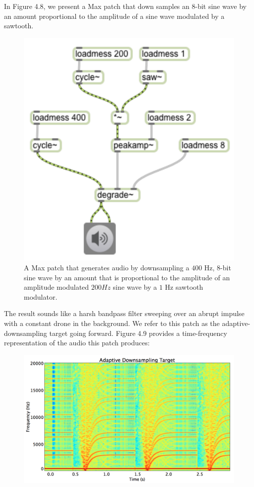 \documentclass[12pt]{report} 	%
\numberwithin{figure}{chapter}
\numberwithin{table}{chapter}
\numberwithin{equation}{chapter}
\begin{document}
\begin{flushleft}
In Figure 4.8, we present a Max patch that down samples an 8-bit sine wave by an amount proportional to the amplitude of a sine wave modulated by a sawtooth. 
\begin{figure}[h!]
\begin{center}
\includegraphics[scale=0.8]{AdaptiveDegrade}
\caption[Adaptive downsampling Max patch]{A Max patch that generates audio by downsampling a $400$ Hz, $8$-bit sine wave by an amount that is proportional to the amplitude of an amplitude modulated $200 Hz$ sine wave by a $1$ Hz sawtooth modulator.}
\end{center}
\end{figure}
The result sounds like a harsh bandpass filter sweeping over an abrupt impulse with a constant drone in the background. We refer to this patch as the adaptive-downsampling target going forward. Figure 4.9 provides a time-frequency representation of the audio this patch produces:
\begin{figure}[h!]
\begin{center}
\includegraphics[width=\linewidth]{AdaptiveDownsamplingTargetSTFT}

\end{center}
\end{figure}
\end{flushleft}
\end{document}

